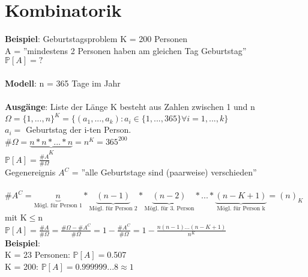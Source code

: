 \chapter{Kombinatorik}
\textbf{Beispiel}: Geburtstagsproblem \hspace{1.5cm} K = 200 Personen\\
A = ''mindestens 2 Personen haben am gleichen Tag Geburtstag''\\
$\mathds{P}[A] = ?$\\\\
\textbf{Modell}: n = 365 Tage im Jahr\\\\
\textbf{Ausgänge}: Liste der Länge K besteht aus Zahlen zwischen 1 und n\medskip\\
$\Omega = \{1,...,n\}^K=\{(a_1,...,a_k):a_i \in \{1,...,365\}\forall i = 1,...,k\}$\smallskip\\
$a_i = $ Geburtstag der i-ten Person.\\
\#$\Omega =\underbrace{n*n*...*n}_K = n^K = 365^{200}$\\
$\mathds{P}[A] = \frac{\#A}{\#\Omega}$\smallskip\\
Gegenereignis $A^C$ = ''alle Geburtstage sind (paarweise) verschieden''\\\\
$\#A^C = \underbrace{n}_{\text{Mögl. für Person 1}}*\underbrace{(n-1)}_{\text{Mögl. für Person 2}}*\underbrace{(n-2)}_\text{Mögl. für 3. Person} * ... * \underbrace{(n-K+1)}_\text{Mögl. für Person k} = (n)_K$ mit K$ \leq  $n\medskip\\
$\mathds{P}[A] = \frac{\#A}{\#\Omega} = \frac{\#\Omega-\#A^C}{\#\Omega}=1-\frac{\#A^C}{\#\Omega}=1-\frac{n(n-1)...(n-K+1)}{n^K}$\medskip\\
\textbf{Beispiel}:\\ K = 23 Personen: $\mathds{P}[A]=$0.507\\K = 200: $\mathds{P}[A]=0.999999...8 \approx 1$\newpage
